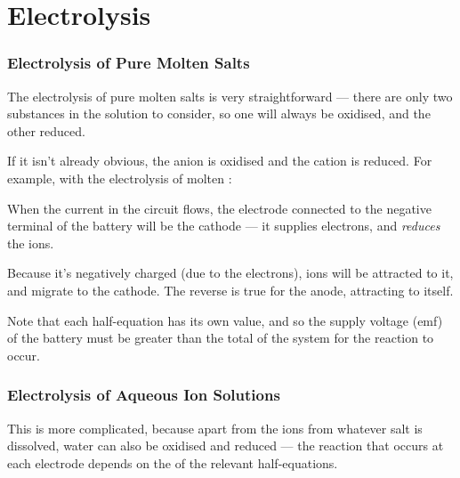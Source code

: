

\pagebreak
\part{Electrolysis}

	\section{Electrolysis of Pure Molten Salts}

		The electrolysis of pure molten salts is very straightforward --- there are only two substances in the solution to consider, so one will
		always be oxidised, and the other reduced.

		If it isn't already obvious, the anion is oxidised and the cation is reduced. For example, with the electrolysis of molten :


		When the current in the circuit flows, the electrode connected to the negative terminal of the battery will be the cathode --- it supplies
		electrons, and \textit{reduces} the  ions.

		Because it's negatively charged (due to the electrons),  ions will be attracted
		to it, and migrate to the cathode. The reverse is true for the anode, attracting \ch{\Cl-} to itself.

		Note that each half-equation has its own \Eo{} value, and so the supply voltage (emf) of the battery must be greater than the total
		\Ecell{} of the system for the reaction to occur.



	\section{Electrolysis of Aqueous Ion Solutions}

		This is more complicated, because apart from the ions from whatever salt is dissolved, water can also be oxidised and reduced --- the
		reaction that occurs at each electrode depends on the \Eo{} of the relevant half-equations.

